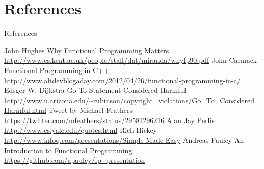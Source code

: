 \documentclass{beamer}
\begin{document}
\section{References}

\begin{frame}[allowframebreaks]{References}
  \begin{thebibliography}{10}
      John Hughes
      \newblock Why Functional Programming Matters
      \newblock \url{http://www.cs.kent.ac.uk/people/staff/dat/miranda/whyfp90.pdf}
      John Carmack
      \newblock Functional Programming in C++
      \newblock \url{http://www.altdevblogaday.com/2012/04/26/functional-programming-in-c/}
      Edsger W. Dijkstra
      \newblock Go To Statement Considered Harmful
      \newblock \url{http://www.u.arizona.edu/~rubinson/copyright_violations/Go_To_Considered_Harmful.html}
      Tweet by Michael Feathers
      \newblock \url{https://twitter.com/mfeathers/status/29581296216}
      Alan Jay Perlis
      \newblock \url{http://www.cs.yale.edu/quotes.html}
      Rich Hickey
      \newblock \url{http://www.infoq.com/presentations/Simple-Made-Easy}
      Andreas Pauley
      \newblock An Introduction to Functional Programming
      \newblock \url{https://github.com/apauley/fp_presentation}
  \end{thebibliography}
\end{frame}
\end{document}
